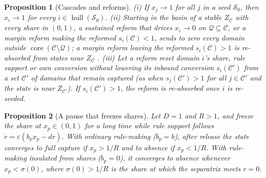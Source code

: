 \documentclass[letterpaper]{article} %
\newtheorem{proposition}{Proposition}
\theoremstyle{definition}
\newcommand{\hull}{\operatorname{hull}}
\newcommand{\core}{\operatorname{core}}
\newcommand{\cC}{\mathcal{C}}
\newcommand{\cQ}{\mathcal{Q}}
\newcommand{\cS}{\mathcal{S}}
\begin{document}
\begin{proposition}[Cascades and reforms]\label{prop:reform}
(i) If $x_j\to1$ for all $j$ in a seed $\cS_0$, then $x_i\to1$ for every $i\in\hull(\cS_0)$. (ii) Starting in the basin of a stable $Z_\cC$ with every share in $(0,1)$, a sustained reform that drives $x_i\to0$ on $\cQ\subseteq\cC$, or a margin reform making the reformed $s_i(\cC)<1$, sends to zero every domain outside $\core(\cC\setminus\cQ)$; a margin reform leaving the reformed $s_i(\cC)>1$ is re-absorbed from states near $Z_\cC$ \citep{acemoglu2008}. (iii) Let a reform reset domain $i$'s share, rule support or own conversion without lowering its inbound conversion $s_i(\cC')$ from a set $\cC'$ of domains that remain captured (as when $s_j(\cC')>1$ for all $j\in\cC'$ and the state is near $Z_{\cC'}$). If $s_i(\cC')>1$, the reform is re-absorbed once $i$ is re-seeded.
\end{proposition}

\begin{proposition}[A pause that freezes shares]\label{prop:pause}
Let $D=1$ and $R>1$, and freeze the share at $x_p\in(0,1)$ for a long time while rule support follows $\dot r=\varepsilon(b_px_p-dr)$. With ordinary rule-making ($b_p=b$), after release the state converges to full capture if $x_p>1/R$ and to absence if $x_p<1/R$. With rule-making insulated from shares ($b_p=0$), it converges to absence whenever $x_p<\sigma(0)$, where $\sigma(0)>1/R$ is the share at which the separatrix meets $r=0$.
\end{proposition}
\end{document}
